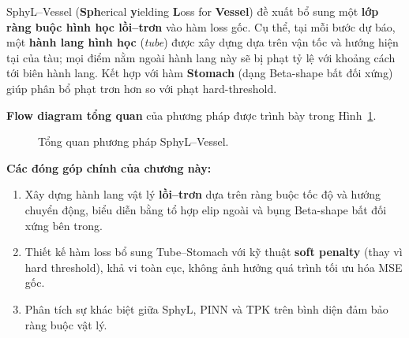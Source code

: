 \documentclass{IEEEtran}
\begin{document}
SphyL--Vessel (\textbf{Sph}erical \textbf{y}ielding
\textbf{L}oss for \textbf{Vessel}) đề xuất bổ sung một
\textbf{lớp ràng buộc hình học lồi--trơn} vào hàm loss gốc.
Cụ thể, tại mỗi bước dự báo, một \textbf{hành lang hình học}
(\textit{tube}) được xây dựng dựa trên vận tốc và hướng hiện tại của tàu;
mọi điểm nằm ngoài hành lang này sẽ bị phạt tỷ lệ với khoảng cách
tới biên hành lang. Kết hợp với hàm \textbf{Stomach} (dạng Beta-shape
bất đối xứng) giúp phân bổ phạt trơn hơn so với phạt hard-threshold.

\textbf{Flow diagram tổng quan} của phương pháp được trình bày
trong Hình~\ref{fig:method-overview}.

\begin{figure}[H]
\centering
{}
\caption{Tổng quan phương pháp SphyL--Vessel.}
\label{fig:method-overview}
\end{figure}

\textbf{Các đóng góp chính của chương này:}
\begin{enumerate}
  \item Xây dựng hành lang vật lý \textbf{lồi--trơn} dựa trên ràng buộc
        tốc độ và hướng chuyển động, biểu diễn bằng tổ hợp elip ngoài
        và bụng Beta-shape bất đối xứng bên trong.
  \item Thiết kế hàm loss bổ sung Tube--Stomach với kỹ thuật
        \textbf{soft penalty} (thay vì hard threshold), khả vi toàn cục,
        không ảnh hưởng quá trình tối ưu hóa MSE gốc.
  \item Phân tích sự khác biệt giữa SphyL, PINN và TPK trên bình diện
        đảm bảo ràng buộc vật lý.
\end{enumerate}
\end{document}
